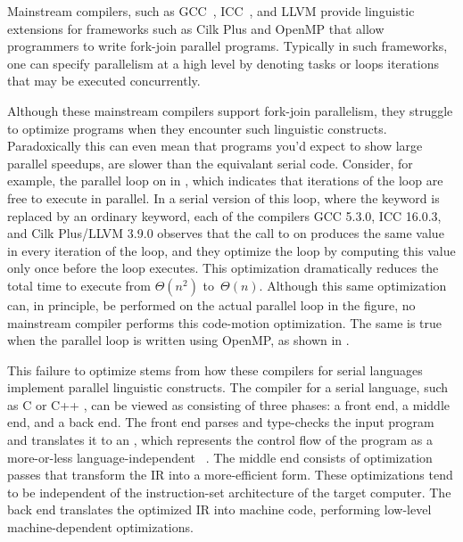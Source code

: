 
Mainstream compilers, such as GCC\ \cite{Stallman16}, ICC\
\cite{Intel15}, and LLVM \cite{LattnerAd04} provide linguistic extensions for frameworks such as Cilk Plus\cite{IntelCilkPlus10} and OpenMP \cite{AyguadeCoDu09, OpenMP13} that allow programmers to write fork-join parallel programs. Typically in such frameworks, one can specify parallelism at a high level by denoting tasks or loops iterations that may be executed concurrently.

Although these mainstream compilers support fork-join parallelism,
they struggle to optimize programs when they encounter such linguistic constructs. 
Paradoxically this can even mean that programs you'd expect to show large parallel speedups,
are slower than the equivalant serial code. Consider, for example, the parallel \CilkFor loop on
\lirefrange{cilk_for} in \subfigref{normalize}{a}, which indicates
that iterations of the loop are free to execute in parallel.  In a
serial version of this loop, where the \CilkFor keyword is replaced by
an ordinary \code{for} keyword, each of the compilers GCC 5.3.0, ICC
16.0.3, and Cilk Plus/LLVM 3.9.0 observes that the call to 
on \liref{normalize_element} produces the same value in every
iteration of the loop, and they optimize the loop by computing this
value only once before the loop executes.  This optimization
dramatically reduces the total time to execute  from
$\Theta(n^2)$ to~$\Theta(n)$.  Although
this same optimization can, in principle, be performed on the actual
parallel loop in the figure, no mainstream compiler performs this
code-motion optimization.  The same is true when the parallel loop is
written using OpenMP, as shown in \subfigref{normalize}{b}.

This failure to optimize stems from how these compilers for serial
languages implement parallel linguistic constructs.  The compiler for
a serial language, such as C \cite{KernighanRi88} or C++
\cite{Stroustrup13}, can be viewed as consisting of three phases: a
front end, a middle end, and a back end.  The front end parses and
type-checks the input program and translates it to an
, which represents the control
flow of the program as a more-or-less language-independent
~\cite[Sec.~8.4.3]{AhoLaSe06}.  The
middle end consists of optimization passes that transform the IR into
a more-efficient form.  These optimizations tend to be independent of
the instruction-set architecture of the target computer.  The back end translates the optimized IR into machine code, performing low-level
machine-dependent optimizations.

